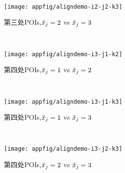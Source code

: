 {\begin{appfig}[!htb]
\begin{subfigure}[b]{\trif\textwidth}
		\end{subfigure}
		~%
		\begin{subfigure}[b]{\trif\textwidth}
			\texttt{[image: appfig/aligndemo-i2-j2-k3]}
			\caption{第三处POIs,$\tilde{x}_j=2$ vs $\tilde{x}_j=3$}
			\label{fig:aligndemo223}
		\end{subfigure}
		\\%
		\begin{subfigure}[b]{\trif\textwidth}
			\texttt{[image: appfig/aligndemo-i3-j1-k2]}
			\caption{第四处POIs,$\tilde{x}_j=1$ vs $\tilde{x}_j=2$}
			\label{fig:aligndemo312}
		\end{subfigure}%
		~%
		\begin{subfigure}[b]{\trif\textwidth}
			\texttt{[image: appfig/aligndemo-i3-j1-k3]}
			\caption{第四处POIs,$\tilde{x}_j=1$ vs $\tilde{x}_j=3$}
			\label{fig:aligndemo313}
		\end{subfigure}
		~%
		\begin{subfigure}[b]{\trif\textwidth}
			\texttt{[image: appfig/aligndemo-i3-j2-k3]}
			\caption{第四处POIs,$\tilde{x}_j=2$ vs $\tilde{x}_j=3$}
			\label{fig:aligndemo323}
		\end{subfigure}
		\\%
		\label{appfig:aligndemoall}
	\end{appfig}
	
}
